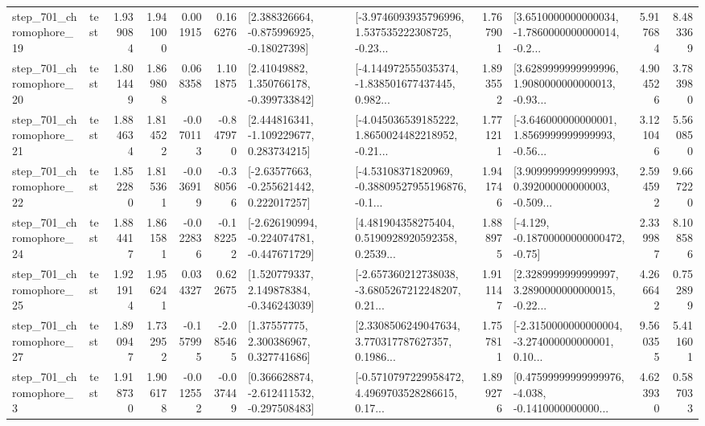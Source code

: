 \begin{tabular}{llrrrrllrlrr}
  step\_701\_chromophore\_19 &      test &      1.939084 &    1.941000 &      0.001915 &  0.166276 &    [2.388326664, -0.875996925, -0.18027398] &  [-3.9746093935796996, 1.537535222308725, -0.23... &       1.767901 &  [3.6510000000000034, -1.7860000000000014, -0.2... &            5.917684 &          8.483369 \\
  step\_701\_chromophore\_20 &      test &      1.801449 &    1.869808 &      0.068358 &  1.101875 &     [2.41049882, 1.350766178, -0.399733842] &  [-4.144972555035374, -1.838501677437445, 0.982... &       1.893552 &  [3.6289999999999996, 1.9080000000000013, -0.93... &            4.904526 &          3.783980 \\
  step\_701\_chromophore\_21 &      test &      1.884634 &    1.814522 &     -0.070113 & -0.847970 &    [2.444816341, -1.109229677, 0.283734215] &  [-4.045036539185222, 1.8650024482218952, -0.21... &       1.771211 &  [-3.646000000000001, 1.8569999999999993, -0.56... &            3.121046 &          5.560850 \\
  step\_701\_chromophore\_22 &      test &      1.852280 &    1.815361 &     -0.036919 & -0.380566 &    [-2.63577663, -0.255621442, 0.222017257] &  [-4.53108371820969, -0.38809527955196876, -0.1... &       1.941746 &  [3.9099999999999993, 0.392000000000003, -0.509... &            2.594592 &          9.667220 \\
  step\_701\_chromophore\_24 &      test &      1.884417 &    1.861581 &     -0.022836 & -0.182252 &  [-2.626190994, -0.224074781, -0.447671729] &  [4.481904358275404, 0.5190928920592358, 0.2539... &       1.888975 &              [-4.129, -0.18700000000000472, -0.75] &            2.339987 &          8.108586 \\
  step\_701\_chromophore\_25 &      test &      1.921914 &    1.956241 &      0.034327 &  0.622675 &    [1.520779337, 2.149878384, -0.346243039] &  [-2.657360212738038, -3.6805267212248207, 0.21... &       1.911147 &  [2.3289999999999997, 3.2890000000000015, -0.22... &            4.266642 &          0.752899 \\
  step\_701\_chromophore\_27 &      test &      1.890947 &    1.732952 &     -0.157995 & -2.085465 &      [1.37557775, 2.300386967, 0.327741686] &  [2.3308506249047634, 3.770317787627357, 0.1986... &       1.757811 &  [-2.3150000000000004, -3.274000000000001, 0.10... &            9.560355 &          5.411601 \\
   step\_701\_chromophore\_3 &      test &      1.918730 &    1.906178 &     -0.012552 & -0.037449 &   [0.366628874, -2.612411532, -0.297508483] &  [-0.5710797229958472, 4.4969703528286615, 0.17... &       1.899276 &  [0.47599999999999976, -4.038, -0.1410000000000... &            4.623930 &          0.587033 \\

\end{tabular}
